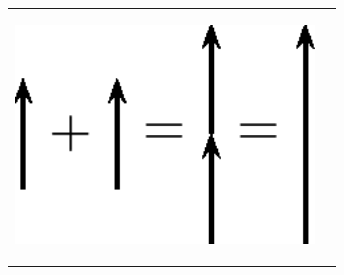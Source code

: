         \begin{center}
      
      \label{m38813*id188639}
      
    \noindent
      \tablelasttail{}
      \begin{xtabular*}{\mytablewidth}[t]{|p{10\mystarwidth}|p{10\mystarwidth}|}\hline
    
    
        
                  
    \setcounter{subfigure}{0}

\label{m38813*id188647}
    \begin{center}
    \label{m38813*id188647!!!underscore!!!media}\label{m38813*id188647!!!underscore!!!printimage}\includegraphics[width=300px]{col11305.imgs/m38813_PG11C1_018.png} %
        
      \vspace{2pt}
    \vspace{.1in}
    
    \end{center}



    \addtocounter{footnote}{-0}
    
                 &
    
    
        
                  
    \setcounter{subfigure}{0}


\end{xtabular*}
\end{center}
